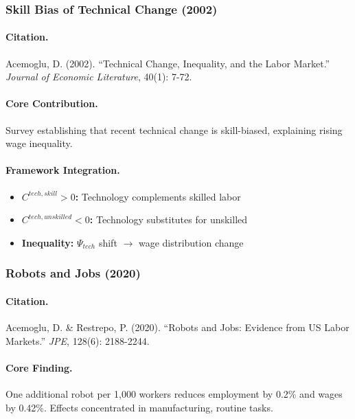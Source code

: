 \subsubsection{Skill Bias of Technical Change (2002)}

\paragraph{Citation.}
Acemoglu, D. (2002). ``Technical Change, Inequality, and the Labor Market.''
\emph{Journal of Economic Literature}, 40(1): 7-72.

\paragraph{Core Contribution.}
Survey establishing that recent technical change is skill-biased,
explaining rising wage inequality.

\paragraph{Framework Integration.}
\begin{itemize}
  \item \textbf{$C^{tech,skill} > 0$:} Technology complements skilled labor
  \item \textbf{$C^{tech,unskilled} < 0$:} Technology substitutes for unskilled
  \item \textbf{Inequality:} $\Psi_{tech}$ shift $\to$ wage distribution change
\end{itemize}

\subsubsection{Robots and Jobs (2020)}

\paragraph{Citation.}
Acemoglu, D. \& Restrepo, P. (2020).
``Robots and Jobs: Evidence from US Labor Markets.''
\emph{JPE}, 128(6): 2188-2244.

\paragraph{Core Finding.}
One additional robot per 1,000 workers reduces employment by 0.2\%
and wages by 0.42\%. Effects concentrated in manufacturing, routine tasks.


